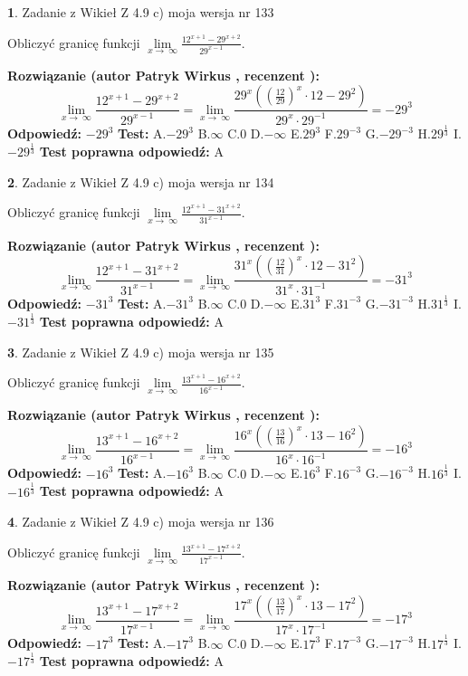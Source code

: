 \documentclass[12pt, a4paper]{article}
\theoremstyle{definition} %
\newtheorem{zad}{}
\newcommand{\zadStart}[1]{\begin{zad}#1\newline}
\newcommand{\zadStop}{\end{zad}}
\newcommand{\rozwStart}[2]{\noindent \textbf{Rozwiązanie (autor #1 , recenzent #2): }\newline}
\newcommand{\rozwStop}{\newline}
\newcommand{\odpStart}{\noindent \textbf{Odpowiedź:}\newline}
\newcommand{\odpStop}{\newline}
\newcommand{\testStart}{\noindent \textbf{Test:}\newline}
\newcommand{\testStop}{\newline}
\newcommand{\kluczStart}{\noindent \textbf{Test poprawna odpowiedź:}\newline}
\newcommand{\kluczStop}{\newline}
\begin{document}
\zadStart{Zadanie z Wikieł Z 4.9 c) moja wersja nr 133}


Obliczyć granicę funkcji  $\lim\limits_{x\to\ \infty}\frac{12^{x+1}-29^{x+2}}{29^{x-1}}$.
\zadStop
\rozwStart{Patryk Wirkus}{}
$$\lim\limits_{x\to\ \infty}\frac{12^{x+1}-29^{x+2}}{29^{x-1}}=\lim\limits_{x\to\ \infty}\frac{29^{x}((\frac{12}{29})^{x}\cdot 12 -29^{2})}{29^{x}\cdot 29^{-1}} = -29^{3}$$
\rozwStop
\odpStart
$-29^{3}$
\odpStop
\testStart
A.$-29^{3}$ B.$\infty$ C.$0$ D.$-\infty$ E.$29^{3}$
F.$29^{-3}$ G.$-29^{-3}$
H.$29^{\frac{1}{3}}$
I.$-29^{\frac{1}{3}}$
\testStop
\kluczStart
A
\kluczStop



\zadStart{Zadanie z Wikieł Z 4.9 c) moja wersja nr 134}


Obliczyć granicę funkcji  $\lim\limits_{x\to\ \infty}\frac{12^{x+1}-31^{x+2}}{31^{x-1}}$.
\zadStop
\rozwStart{Patryk Wirkus}{}
$$\lim\limits_{x\to\ \infty}\frac{12^{x+1}-31^{x+2}}{31^{x-1}}=\lim\limits_{x\to\ \infty}\frac{31^{x}((\frac{12}{31})^{x}\cdot 12 -31^{2})}{31^{x}\cdot 31^{-1}} = -31^{3}$$
\rozwStop
\odpStart
$-31^{3}$
\odpStop
\testStart
A.$-31^{3}$ B.$\infty$ C.$0$ D.$-\infty$ E.$31^{3}$
F.$31^{-3}$ G.$-31^{-3}$
H.$31^{\frac{1}{3}}$
I.$-31^{\frac{1}{3}}$
\testStop
\kluczStart
A
\kluczStop



\zadStart{Zadanie z Wikieł Z 4.9 c) moja wersja nr 135}


Obliczyć granicę funkcji  $\lim\limits_{x\to\ \infty}\frac{13^{x+1}-16^{x+2}}{16^{x-1}}$.
\zadStop
\rozwStart{Patryk Wirkus}{}
$$\lim\limits_{x\to\ \infty}\frac{13^{x+1}-16^{x+2}}{16^{x-1}}=\lim\limits_{x\to\ \infty}\frac{16^{x}((\frac{13}{16})^{x}\cdot 13 -16^{2})}{16^{x}\cdot 16^{-1}} = -16^{3}$$
\rozwStop
\odpStart
$-16^{3}$
\odpStop
\testStart
A.$-16^{3}$ B.$\infty$ C.$0$ D.$-\infty$ E.$16^{3}$
F.$16^{-3}$ G.$-16^{-3}$
H.$16^{\frac{1}{3}}$
I.$-16^{\frac{1}{3}}$
\testStop
\kluczStart
A
\kluczStop



\zadStart{Zadanie z Wikieł Z 4.9 c) moja wersja nr 136}


Obliczyć granicę funkcji  $\lim\limits_{x\to\ \infty}\frac{13^{x+1}-17^{x+2}}{17^{x-1}}$.
\zadStop
\rozwStart{Patryk Wirkus}{}
$$\lim\limits_{x\to\ \infty}\frac{13^{x+1}-17^{x+2}}{17^{x-1}}=\lim\limits_{x\to\ \infty}\frac{17^{x}((\frac{13}{17})^{x}\cdot 13 -17^{2})}{17^{x}\cdot 17^{-1}} = -17^{3}$$
\rozwStop
\odpStart
$-17^{3}$
\odpStop
\testStart
A.$-17^{3}$ B.$\infty$ C.$0$ D.$-\infty$ E.$17^{3}$
F.$17^{-3}$ G.$-17^{-3}$
H.$17^{\frac{1}{3}}$
I.$-17^{\frac{1}{3}}$
\testStop
\kluczStart
A
\kluczStop
\end{document}
